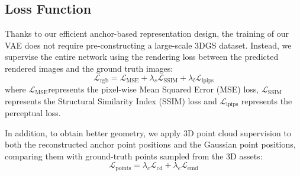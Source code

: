 \subsection{Loss Function}
\label{sec:loss}
Thanks to our efficient anchor-based representation design, the training of our VAE does not require pre-constructing a large-scale 3DGS dataset. Instead, we supervise the entire network using the rendering loss between the predicted rendered images and the ground truth images:
\begin{equation}
    \mathcal{L}_{\text{rgb}} = \mathcal{L}_{\text{MSE}} + \lambda_s \mathcal{L}_{\text{SSIM}} + \lambda_l \mathcal{L}_{\text{lpips}}
\end{equation}
where $\mathcal{L}_{\text{MSE}}$represents the pixel-wise Mean Squared Error (MSE) loss, $\mathcal{L}_{\text{SSIM}}$ represents the Structural Similarity Index (SSIM) loss and $\mathcal{L}_{\text{lpips}}$ represents the perceptual loss.

In addition, to obtain better geometry, we apply 3D point cloud supervision to both the reconstructed anchor point positions and the Gaussian point positions, comparing them with ground-truth points sampled from the 3D assets:
\begin{equation}
    \mathcal{L}_{\text{points}} = \lambda_c \mathcal{L}_{\text{cd}} + \lambda_e \mathcal{L}_{\text{emd}}
\end{equation}

